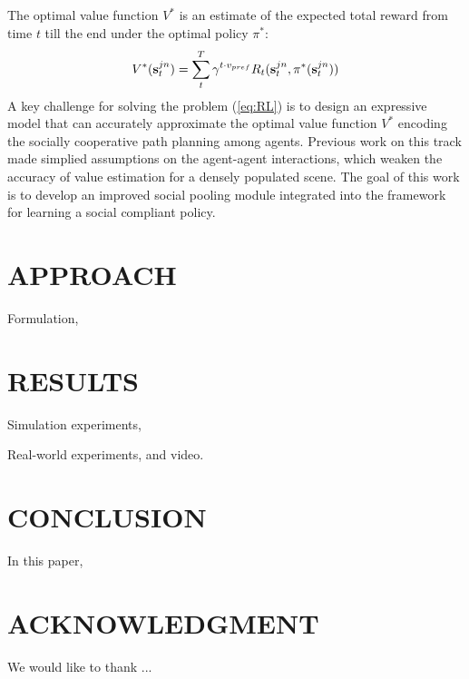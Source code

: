\documentclass[letterpaper, 10 pt, conference]{ieeeconf}  %
\begin{document}
The optimal value function $V^*$ is an estimate of the expected total reward from time $t$ till the end under the optimal policy $\pi^*$: 
\begin{equation}
V^*(\bold{s}_t^{jn}) = \sum_{t}^T \gamma^{t \cdot v_{pref}} R_t(\bold{s}_t^{jn},\pi^*(\bold{s}_t^{jn}))
\end{equation}
A key challenge for solving the problem (\ref{eq:RL}) is to design an expressive model that can accurately approximate the optimal value function $V^{*}$ encoding the socially cooperative path planning among agents. Previous work on this track made simplied assumptions on the agent-agent interactions, which weaken the accuracy of value estimation for a densely populated scene. The goal of this work is to develop an improved social pooling module integrated into the framework for learning a social compliant policy. 

\section{APPROACH} \label{sec:approach} 

Formulation, 

\section{RESULTS} \label{sec:results} 

Simulation experiments, 

Real-world experiments, and video. 

\section{CONCLUSION} \label{sec:conclusion} 

In this paper, 


\addtolength{\textheight}{-10cm}   %

\section*{ACKNOWLEDGMENT}

We would like to thank ... 





\end{document}
